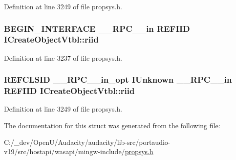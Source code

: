 Definition at line 3249 of file propsys.\+h.

\subsubsection[{\texorpdfstring{riid}{riid}}]{\setlength{\rightskip}{0pt plus 5cm}B\+E\+G\+I\+N\+\_\+\+I\+N\+T\+E\+R\+F\+A\+CE {\bf \+\_\+\+\_\+\+R\+P\+C\+\_\+\+\_\+in} {\bf R\+E\+F\+I\+ID} I\+Create\+Object\+Vtbl\+::riid}\hypertarget{struct_i_create_object_vtbl_a2ba5c3335dc733a64ef7447789db6f67}{}\label{struct_i_create_object_vtbl_a2ba5c3335dc733a64ef7447789db6f67}


Definition at line 3237 of file propsys.\+h.

\subsubsection[{\texorpdfstring{riid}{riid}}]{ R\+E\+F\+C\+L\+S\+ID {\bf \+\_\+\+\_\+\+R\+P\+C\+\_\+\+\_\+in\+\_\+opt} I\+Unknown {\bf \+\_\+\+\_\+\+R\+P\+C\+\_\+\+\_\+in} {\bf R\+E\+F\+I\+ID} I\+Create\+Object\+Vtbl\+::riid}\hypertarget{struct_i_create_object_vtbl_a51aa0b68f17b7a6545ae887cb6d6d38a}{}\label{struct_i_create_object_vtbl_a51aa0b68f17b7a6545ae887cb6d6d38a}


Definition at line 3249 of file propsys.\+h.



The documentation for this struct was generated from the following file\+:\begin{DoxyCompactItemize}
\item 
C\+:/\+\_\+dev/\+Open\+U/\+Audacity/audacity/lib-\/src/portaudio-\/v19/src/hostapi/wasapi/mingw-\/include/\hyperlink{propsys_8h}{propsys.\+h}\end{DoxyCompactItemize}
